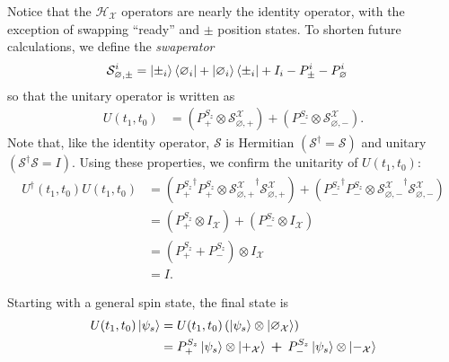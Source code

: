 Notice that the $\mathcal{H}_\mathcal{X}$ operators are nearly the identity operator, with the exception of swapping ``ready'' and $\pm$ position states. To shorten future calculations, we define the \textit{swaperator}
\begin{align}
  \mathcal{S}^i_{\varnothing, \pm} &= \ket{\pm_i}\bra{\varnothing_i} + \ket{\varnothing_i}\bra{\pm_i} + I_i - P^i_\pm - P^i_\varnothing
\end{align}
so that the unitary operator is written as
\begin{align}
  U(t_1, t_0) &= \left(P^{S_z}_+ \otimes \mathcal{S}^{\mathcal{X}}_{\varnothing, +}\right) + \left(P^{S_z}_- \otimes \mathcal{S}^{\mathcal{X}}_{\varnothing, -}\right).
\end{align}
Note that, like the identity operator, $\mathcal{S}$ is Hermitian $\left(\mathcal{S}^\dagger = \mathcal{S}\right)$ and unitary $\left( \mathcal{S}^\dagger \mathcal{S} = I \right)$. Using these properties, we confirm the unitarity of $U(t_1, t_0)$:
\begin{align}
  U^\dagger(t_1, t_0) U(t_1, t_0) &=  \left({P^{S_z}_+}^\dagger {P^{S_z}_+} \otimes {\mathcal{S}^{\mathcal{X}}_{\varnothing, +}}^\dagger \mathcal{S}^{\mathcal{X}}_{\varnothing, +} \right) + \left({P^{S_z}_-}^\dagger P^{S_z}_- \otimes {\mathcal{S}^{\mathcal{X}}_{\varnothing, -}}^\dagger {\mathcal{S}^{\mathcal{X}}_{\varnothing, -}}\right) \\ \nonumber
  &= \left({P^{S_z}_+} \otimes I_\mathcal{X}\right) + \left({P^{S_z}_-} \otimes I_\mathcal{X}\right) \\ \nonumber
  &= \left( {P^{S_z}_+} + {P^{S_z}_-} \right) \otimes I_\mathcal{X} \\ \nonumber
  &= I.
\end{align}

Starting with a general spin state, the final state is
\begin{align} \label{eq: Experiment 1 final state}
  U(t_1, t_0)\ket{\psi_s} & =  U(t_1, t_0) \left(\ket{\psi_s} \otimes \ket{\varnothing_\mathcal{X}} \right) \\
  &= \nonumber P^{S_z}_+ \ket{\psi_s} \otimes \ket{+_{\mathcal{X}}} \: \bm{+} \: P^{S_z}_- \ket{\psi_s} \otimes \ket{-_{\mathcal{X}}}
\end{align}

